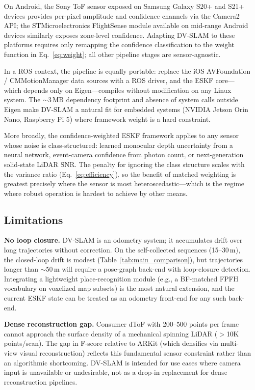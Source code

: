 On Android, the Sony ToF sensor exposed on Samsung Galaxy S20+ and S21+ devices provides per-pixel amplitude and confidence channels via the Camera2 API; the STMicroelectronics FlightSense module available on mid-range Android devices similarly exposes zone-level confidence. Adapting DV-SLAM to these platforms requires only remapping the confidence classification to the weight function in Eq.~\eqref{eq:weight}; all other pipeline stages are sensor-agnostic.

In a ROS context, the pipeline is equally portable: replace the iOS AVFoundation / CMMotionManager data sources with a ROS driver, and the ESKF core---which depends only on Eigen---compiles without modification on any Linux system. The $\sim$3\,MB dependency footprint and absence of system calls outside Eigen make DV-SLAM a natural fit for embedded systems (NVIDIA Jetson Orin Nano, Raspberry Pi 5) where framework weight is a hard constraint.

More broadly, the confidence-weighted ESKF framework applies to any sensor whose noise is class-structured: learned monocular depth uncertainty from a neural network, event-camera confidence from photon count, or next-generation solid-state LiDAR SNR. The penalty for ignoring the class structure scales with the variance ratio (Eq.~\eqref{eq:efficiency}), so the benefit of matched weighting is greatest precisely where the sensor is most heteroscedastic---which is the regime where robust operation is hardest to achieve by other means.

\subsection{Limitations}
\label{sec:limitations}

\textbf{No loop closure.}
DV-SLAM is an odometry system; it accumulates drift over long trajectories without correction. On the self-collected sequences (15--30\,m), the closed-loop drift is modest (Table~\ref{tab:main_comparison}), but trajectories longer than $\sim$50\,m will require a pose-graph back-end with loop-closure detection. Integrating a lightweight place-recognition module (e.g., a BF-matched FPFH vocabulary on voxelized map subsets) is the most natural extension, and the current ESKF state can be treated as an odometry front-end for any such back-end.

\textbf{Dense reconstruction gap.}
Consumer dToF with 200--500 points per frame cannot approach the surface density of a mechanical spinning LiDAR ($>$10K points/scan). The gap in F-score relative to ARKit (which densifies via multi-view visual reconstruction) reflects this fundamental sensor constraint rather than an algorithmic shortcoming. DV-SLAM is intended for use cases where camera input is unavailable or undesirable, not as a drop-in replacement for dense reconstruction pipelines.

